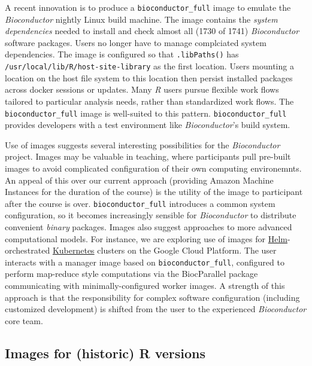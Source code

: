 A recent innovation is to produce a \texttt{bioconductor\_full} image to
emulate the \emph{Bioconductor} nightly Linux build machine. The image
contains the \emph{system dependencies} needed to install and check
almost all (1730 of 1741) \emph{Bioconductor} software packages. Users
no longer have to manage complciated system dependencies. The image is
configured so that \texttt{.libPaths()} has
\texttt{/usr/local/lib/R/host-site-library} as the first location. Users
mounting a location on the host file system to this location then
persist installed packages across docker sessions or updates. Many
\emph{R} users pursue flexible work flows tailored to particular
analysis needs, rather than standardized work flows. The
\texttt{bioconductor\_full} image is well-suited to this pattern.
\texttt{bioconductor\_full} provides developers with a test environment
like \emph{Bioconductor}'s build system.

Use of images suggests several interesting possibilities for the
\emph{Bioconductor} project. Images may be valuable in teaching, where
participants pull pre-built images to avoid complicated configuration of
their own computing environemnts. An appeal of this over our current
approach (providing Amazon Machine Instances for the duration of the
course) is the utility of the image to participant after the course is
over. \texttt{bioconductor\_full} introduces a common system
configuration, so it becomes increasingly sensible for
\emph{Bioconductor} to distribute convenient \emph{binary} packages.
Images also suggest approaches to more advanced computational models.
For instance, we are exploring use of images for
\href{https://helm.sh/}{Helm}-orchestrated
\href{https://kubernetes.io/}{Kubernetes} clusters on the Google Cloud
Platform. The user interacts with a manager image based on
\texttt{bioconductor\_full}, configured to perform map-reduce style
computations via the BiocParallel package communicating with
minimally-configured worker images. A strength of this approach is that
the responsibility for complex software configuration (including
customized development) is shifted from the user to the experienced
\emph{Bioconductor} core team.

\hypertarget{images-for-historic-r-versions}{%
\subsection{Images for (historic) R
versions}\label{images-for-historic-r-versions}}

